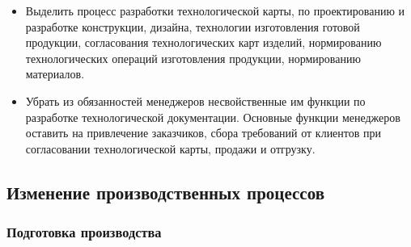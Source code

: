 
 \begin{itemize}

\item Выделить процесс разработки технологической карты, 
 по проектированию и разработке конструкции, дизайна, технологии изготовления готовой продукции, согласования технологических карт изделий, нормированию технологических операций изготовления продукции, нормированию материалов.

\item Убрать из обязанностей менеджеров несвойственные им функции по разработке технологической документации. Основные функции менеджеров оставить на привлечение заказчиков, сбора требований от клиентов при согласовании технологической карты, продажи и отгрузку.





 \end{itemize}



\subsection{Изменение производственных процессов}

\subsubsection{Подготовка производства}


